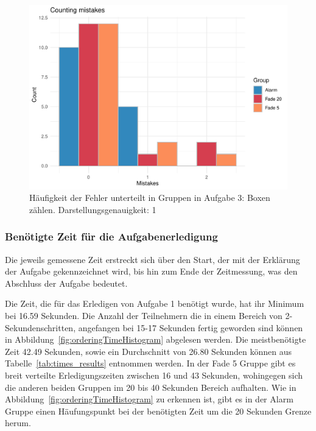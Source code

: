 \begin{figure}[H]
	\centering
	\includegraphics[width=\textwidth]{./_StudyResults/countingMisHist}
	\caption{Häufigkeit der Fehler unterteilt in Gruppen in Aufgabe 3: Boxen zählen. Darstellungsgenauigkeit: 1}
	\label{fig:countingMistakeHistogram}
\end{figure}

\subsubsection{Benötigte Zeit für die Aufgabenerledigung}

Die jeweils gemessene Zeit erstreckt sich über den Start, der mit der Erklärung der Aufgabe gekennzeichnet wird, bis hin zum Ende der Zeitmessung, was den Abschluss der Aufgabe bedeutet.

Die Zeit, die für das Erledigen von Aufgabe 1 benötigt wurde, hat ihr Minimum bei 16.59 Sekunden. Die Anzahl der Teilnehmern die in einem Bereich von 2-Sekundenschritten, angefangen bei 15-17 Sekunden fertig geworden sind können in Abbildung~\ref{fig:orderingTimeHistogram} abgelesen werden. Die meistbenötigte Zeit 42.49 Sekunden, sowie ein Durchschnitt von 26.80 Sekunden können aus Tabelle~\ref{tab:times_results} entnommen werden.
In der Fade 5 Gruppe gibt es breit verteilte Erledigungszeiten zwischen 16 und 43 Sekunden, wohingegen sich die anderen beiden Gruppen im 20 bis 40 Sekunden Bereich aufhalten. Wie in Abbildung~\ref{fig:orderingTimeHistogram} zu erkennen ist, gibt es in der Alarm Gruppe einen Häufungspunkt bei der benötigten Zeit um die 20 Sekunden Grenze herum.

